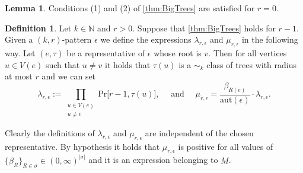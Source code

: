 \documentclass[12pt,notitlepage,a4paper]{article}
\theoremstyle{definition}
\newtheorem{lemma}{Lemma}[section]
\newtheorem{definition}{Definition}[section]
\newcommand{\N}{\mathbb{N}}
\newcommand{\aut}{\mathrm{aut}}
\begin{document}
\begin{lemma}
	Conditions (1) and (2) of \cref{thm:BigTrees} 
	are satisfied for $r=0$.
\end{lemma}

\begin{definition}
	Let $k\in \N$ and $r>0$. 
	Suppose that \cref{thm:BigTrees} holds for $r-1$.
	Given a $(k,r)$-pattern $\epsilon$ we define the expressions
	$\lambda_{r,\epsilon}$ and $\mu_{r,\epsilon}$ in the following way.
	Let $(e,\tau)$ be a representative of $\epsilon$
	whose root is $v$. Then for all vertices $u\in V(e)$ such that
	$u\neq v$ it holds that $\tau(u)$ is a $\sim_k$ class of trees with
	radius at most $r$ and we can set  
	\[
	\lambda_{r,\epsilon}:=\prod_{\substack{u\in V(e)\\ u\neq v} } \mathrm{Pr}\big[
	r-1, \tau(u)\big], \quad \text{ and } \quad
	\mu_{r,\epsilon}=\frac{\beta_{R(e)}}{\aut(\epsilon)} 
	\cdot \lambda_{r,\epsilon}.
	\]
\end{definition}	
Clearly the definitions of $\lambda_{r,\epsilon}$ and
$\mu_{r,\epsilon}$ are independent of the chosen representative.
By hypothesis it holds
that $\mu_{r,\epsilon}$ is positive for all values of
$\{ \beta_R \}_{R\in \sigma}\in (0,\infty)^{|\sigma|}$
and it is an expression belonging to $M$.
\end{document}
